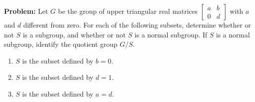 \documentclass[10pt]{article}
\newenvironment{problem}{\textbf{Problem:}}{}
\begin{document}
\begin{problem}
	Let \( G \) be the group of upper triangular real matrices 
	\( \begin{bmatrix} a & b \\ 0 & d \end{bmatrix}  \) with 
	\( a \) and \( d \) different from zero. For each of the following subsets, 
	determine whether or not  \( S \) is a subgroup, and whether or not 
	\( S \) is a normal subgroup. If \( S \) is a normal subgroup, identify the 
	quotient group \( G / S \). 
	\begin{enumerate}[label=\roman*)]
		\item \( S \) is the subset defined by \( b = 0 \). 
		\item \( S \) is the subset defined by \( d = 1 \).
		\item \( S \) is the subset defined by \( a = d \). 
	\end{enumerate}
\end{problem}
\end{document}
